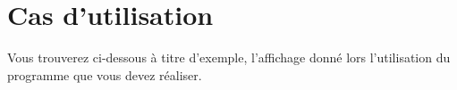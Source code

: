 \documentclass[10pt]{article}
\begin{document}

\section*{Cas d'utilisation}

Vous trouverez ci-dessous à titre d'exemple, l'affichage donné lors l'utilisation du programme que vous devez réaliser.

\newpage{}   



\end{document}
